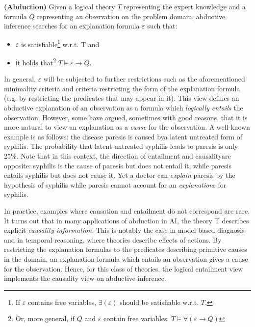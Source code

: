 \begin{definition}{\textbf{(Abduction)}}
\label{def:abduction}
Given a logical theory $\mathit{T}$ representing the expert knowledge and a formula $\mathit{Q}$ representing an observation on the problem domain, abductive inference searches for an explanation formula $\varepsilon$ such that:
\begin{itemize}
  \item $\varepsilon$ is satisfiable\footnote{If $\varepsilon$ contains free variables, $\exists(\varepsilon)$ should be satisfiable w.r.t. $\mathit{T}$.} w.r.t. T and
  \item it holds that\footnote{Or, more general, if $\mathit{Q}$ and $\varepsilon$ contain free variables: $\mathit{T} \models \forall(\varepsilon \rightarrow \mathit{Q}) $} $\mathit{T} \models \varepsilon \rightarrow \mathit{Q}$.
\end{itemize}
\end{definition}
In general, $\varepsilon$ will be subjected to further restrictions such as the aforementioned minimality criteria and criteria restricting the form of the explanation formula (e.g. by restricting the predicates that may appear in it). This view defines an abductive explanation of an observation as a formula which \textit{logically entails} the observation. However, some have argued, sometimes with good reasons, that it is more natural to view an explanation as a \textit{cause} for the observation. A well-known example is as follows: the disease paresis is caused bya latent untreated form of syphilis. The probability that latent untreated syphilis leads to paresis is only 25\%. Note that in this context, the direction of entailment and causalityare opposite: syphilis is the cause of paresis but does not entail it, while paresis entails syphilis but does not cause it. Yet a doctor can \textit{explain} paresis by the hypothesis of syphilis while paresis cannot account for an \textit{explanation}s for syphilis.

In practice, examples where causation and entailment do not correspond are rare. It turns out that in many applications of abduction in AI, the theory T describes explicit \textit{causality information}. This is notably the case in model-based diagnosis and in temporal reasoning, where theories describe effects of actions. By restricting the explanation formulas to the predicates describing primitive causes in the domain, an explanation formula which entails an observation gives a cause for the observation. Hence, for this class of theories, the logical entailment view implements the causality view on abductive inference.

